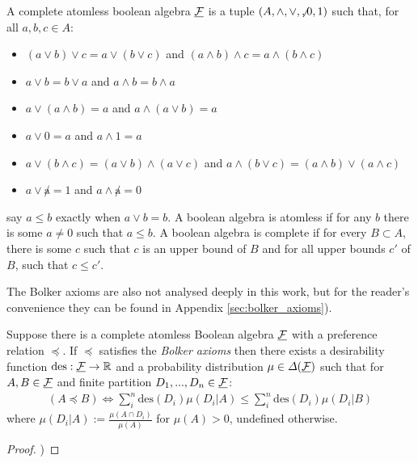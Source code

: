 \begin{definition}\label{def:c_atom_ba}
A complete atomless boolean algebra $\underline{\mathcal{F}}$ is a tuple $(A,\land,\lor,\not,0,1)$ such that, for all $a,b,c\in A$:
\begin{itemize}
    \item $(a\lor b)\lor c = a\lor (b\lor c)$ and $(a\land b)\land c = a\land (b\land c)$
    \item $a\lor b = b\lor a$ and $a\land b = b\land a$
    \item $a\lor (a\land b) = a$ and $a\land(a\lor b) = a$
    \item $a\lor 0 = a$ and $a\land 1=a$
    \item $a\lor(b\land c) = (a\lor b) \land (a\lor c)$ and $a\land(b\lor c) = (a\land b) \lor (a\land c)$
    \item $a\lor \not a = 1$ and $a\land \not a = 0$
\end{itemize}
say $a\leq b$ exactly when $a\lor b = b$. A boolean algebra is atomless if for any $b$ there is some $a\neq 0$ such that $a\leq b$. A boolean algebra is complete if for every $B\subset A$, there is some $c$ such that $c$ is an upper bound of $B$ and for all upper bounds $c'$  of $B$, such that $c\leq c'$. 
\end{definition}

The Bolker axioms are also not analysed deeply in this work, but for the reader's convenience they can be found in Appendix \ref{sec:bolker_axioms}).

\begin{theorem}\label{th:bolker_jeffrey}
Suppose there is a complete atomless Boolean algebra $\underline{\mathcal{F}}$ with a preference relation $\preceq$. If $\preceq$ satisfies the \emph{Bolker axioms} then there exists a desirability function $\text{des}:\underline{\mathcal{F}}\to\mathbb{R}$ and a probability distribution $\mu\in \Delta(\underline{\mathcal{F}})$ such that for $A,B\in \underline{\mathcal{F}}$ and finite partition $D_1,...,D_n\in \underline{\mathcal{F}}$:
\begin{align}
    (A \preceq B) \iff \sum_{i}^n \text{des}(D_i) \mu(D_i|A) \leq \sum_{i}^n \text{des}(D_i) \mu(D_i|B) \label{eq:ev_dec_theory}
\end{align}
where $\mu(D_i|A):=\frac{\mu(A\cap D_i)}{\mu(A)}$ for $\mu(A)>0$, undefined otherwise.
\end{theorem}

\begin{proof}
\citet{bolker_functions_1966})
\end{proof}

